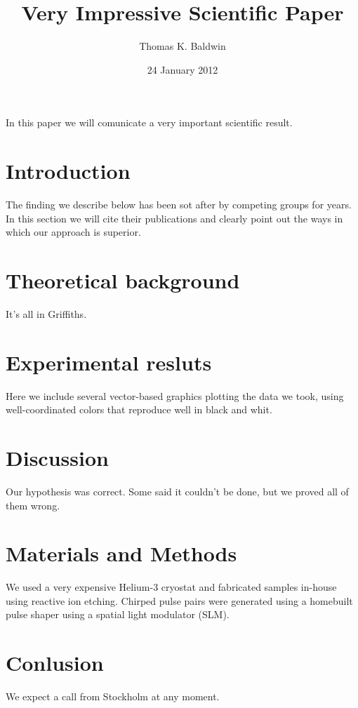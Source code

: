 \documentclass[11pt]{amsart}
\title{Very Impressive Scientific Paper}
\author{Thomas K. Baldwin}
\date{24 January 2012}
\begin{document}
\maketitle

In this paper we will comunicate a very important scientific result.

\section{Introduction}

The finding we describe below has been sot after by competing groups
for years. In this section we will cite their publications and clearly
point out the ways in which our approach is superior.

\section{Theoretical background}

It's all in Griffiths.

\section{Experimental resluts}

Here we include several vector-based graphics plotting the data we
took, using well-coordinated colors that reproduce well in black and
whit.

\section{Discussion}

Our hypothesis was correct. Some said it couldn't be done, but we
proved all of them wrong.

\section{Materials and Methods}

We used a very expensive Helium-3 cryostat and fabricated samples
in-house using reactive ion etching. Chirped pulse pairs were
generated using a homebuilt pulse shaper using a spatial light
modulator (SLM).

\section{Conlusion}

We expect a call from Stockholm at any moment.
\end{document}
